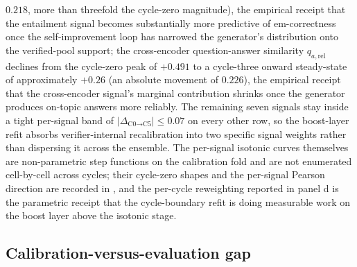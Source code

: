 $0.218$, more than threefold the cycle-zero magnitude), the empirical receipt that the entailment signal becomes substantially more predictive of em-correctness once the self-improvement loop has narrowed the generator's distribution onto the verified-pool support; the cross-encoder question-answer similarity $q_{a,\text{rel}}$ declines from the cycle-zero peak of $+0.491$ to a cycle-three onward steady-state of approximately $+0.26$ (an absolute movement of $0.226$), the empirical receipt that the cross-encoder signal's marginal contribution shrinks once the generator produces on-topic answers more reliably. The remaining seven signals stay inside a tight per-signal band of $|\Delta_{\text{C0}\to\text{C5}}| \le 0.07$ on every other row, so the boost-layer refit absorbs verifier-internal recalibration into two specific signal weights rather than dispersing it across the ensemble. The per-signal isotonic curves themselves are non-parametric step functions on the calibration fold and are not enumerated cell-by-cell across cycles; their cycle-zero shapes and the per-signal Pearson direction are recorded in , and the per-cycle reweighting reported in panel d is the parametric receipt that the cycle-boundary refit is doing measurable work on the boost layer above the isotonic stage.



\FloatBarrier

\subsection{Calibration-versus-evaluation gap}
\label{sec:adj-cal-eval-gap}

